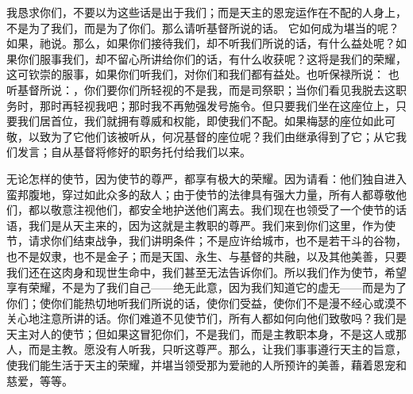 我恳求你们，不要以为这些话是出于我们；而是天主的恩宠运作在不配的人身上，不是为了我们，而是为了你们。那么请听基督所说的话。 它如何成为堪当的呢？如果，祂说。那么，如果你们接待我们，却不听我们所说的话，有什么益处呢？如果你们服事我们，却不留心所讲给你们的话，有什么收获呢？这将是我们的荣耀，这可钦崇的服事，如果你们听我们，对你们和我们都有益处。也听保禄所说： 也听基督所说：，你们要你们所轻视的不是我，而是司祭职；当你们看见我脱去这职务时，那时再轻视我吧；那时我不再勉强发号施令。但只要我们坐在这座位上，只要我们居首位，我们就拥有尊威和权能，即使我们不配。如果梅瑟的座位如此可敬，以致为了它他们该被听从，何况基督的座位呢？我们由继承得到了它；从它我们发言；自从基督将修好的职务托付给我们以来。\par

无论怎样的使节，因为使节的尊严，都享有极大的荣耀。因为请看：他们独自进入蛮邦腹地，穿过如此众多的敌人；由于使节的法律具有强大力量，所有人都尊敬他们，都以敬意注视他们，都安全地护送他们离去。我们现在也领受了一个使节的话语，我们是从天主来的，因为这就是主教职的尊严。我们来到你们这里，作为使节，请求你们结束战争，我们讲明条件；不是应许给城市，也不是若干斗的谷物，也不是奴隶，也不是金子；而是天国、永生、与基督的共融，以及其他美善，只要我们还在这肉身和现世生命中，我们甚至无法告诉你们。所以我们作为使节，希望享有荣耀，不是为了我们自己——绝无此意，因为我们知道它的虚无——而是为了你们；使你们能热切地听我们所说的话，使你们受益，使你们不是漫不经心或漠不关心地注意所讲的话。你们难道不见使节们，所有人都如何向他们致敬吗？我们是天主对人的使节；但如果这冒犯你们，不是我们，而是主教职本身，不是这人或那人，而是主教。愿没有人听我，只听这尊严。那么，让我们事事遵行天主的旨意，使我们能生活于天主的荣耀，并堪当领受那为爱祂的人所预许的美善，藉着恩宠和慈爱，等等。\par



\section{}

